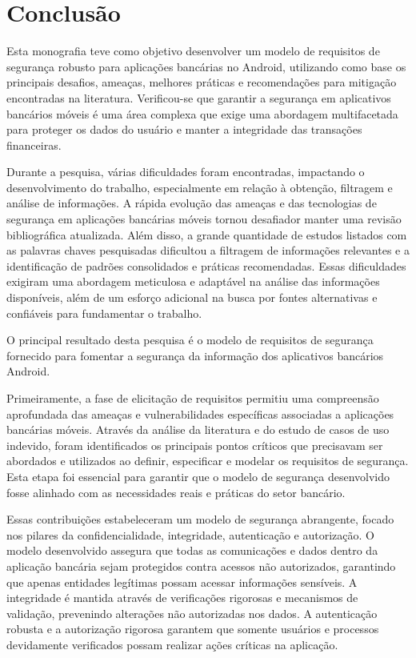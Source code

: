 
    \chapter{Conclusão}
    
    Esta monografia teve como objetivo desenvolver um modelo de requisitos de segurança robusto para aplicações bancárias no Android, utilizando como base os principais desafios, ameaças, melhores práticas e recomendações para mitigação encontradas na literatura. Verificou-se que garantir a segurança em aplicativos bancários móveis é uma área complexa que exige uma abordagem multifacetada para proteger os dados do usuário e manter a integridade das transações financeiras.

    Durante a pesquisa, várias dificuldades foram encontradas, impactando o desenvolvimento do trabalho, especialmente em relação à obtenção, filtragem e análise de informações. A rápida evolução das ameaças e das tecnologias de segurança em aplicações bancárias móveis tornou desafiador manter uma revisão bibliográfica atualizada. Além disso, a grande quantidade de estudos listados com as palavras chaves pesquisadas dificultou a filtragem de informações relevantes e a identificação de padrões consolidados e práticas recomendadas. Essas dificuldades exigiram uma abordagem meticulosa e adaptável na análise das informações disponíveis, além de um esforço adicional na busca por fontes alternativas e confiáveis para fundamentar o trabalho.

    O principal resultado desta pesquisa é o modelo de requisitos de segurança fornecido para fomentar a segurança da informação dos aplicativos bancários Android.

    Primeiramente, a fase de elicitação de requisitos permitiu uma compreensão aprofundada das ameaças e vulnerabilidades específicas associadas a aplicações bancárias móveis. Através da análise da literatura e do estudo de casos de uso indevido, foram identificados os principais pontos críticos que precisavam ser abordados e utilizados ao definir, especificar e modelar os requisitos de segurança. Esta etapa foi essencial para garantir que o modelo de segurança desenvolvido fosse alinhado com as necessidades reais e práticas do setor bancário. 
    
    Essas contribuições estabeleceram um modelo de segurança abrangente, focado nos pilares da confidencialidade, integridade, autenticação e autorização. O modelo desenvolvido assegura que todas as comunicações e dados dentro da aplicação bancária sejam protegidos contra acessos não autorizados, garantindo que apenas entidades legítimas possam acessar informações sensíveis. A integridade é mantida através de verificações rigorosas e mecanismos de validação, prevenindo alterações não autorizadas nos dados. A autenticação robusta e a autorização rigorosa garantem que somente usuários e processos devidamente verificados possam realizar ações críticas na aplicação. 

